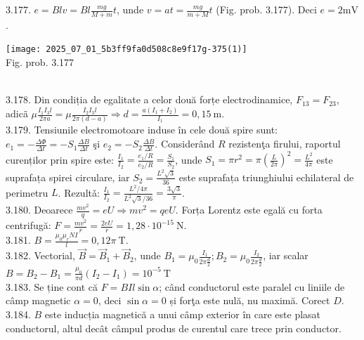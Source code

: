 \begin{center}
3.177. $e=B l v=B l \frac{m g}{M+m} t$, unde $v=a t=\frac{m g}{m+M} t$ (Fig. prob. 3.177). Deci $e=2 \mathrm{mV}$.\\ \begin{center} \texttt{[image: 2025\_07\_01\_5b3ff9fa0d508c8e9f17g-375(1)]}\\ Fig. prob. 3.177 \end{center}\\

3.178. Din condiția de egalitate a celor două forțe electrodinamice, $F_{13}=F_{23}$, adicã $\mu \frac{I_{1} I_{3} l}{2 \pi a}=\mu \frac{I_{2} I_{3} l}{2 \pi(d-a)} \Rightarrow d=\frac{a\left(I_{1}+I_{2}\right)}{I_{1}}=0,15 \mathrm{~m}$.\\

3.179. Tensiunile electromotoare induse în cele două spire sunt: $e_{1}=-\frac{\Delta \Phi}{\Delta t}=-S_{1} \frac{\Delta B}{\Delta t}$ şi $e_{2}=-S_{2} \frac{\Delta B}{\Delta t}$. Considerând $R$ rezistenţa firului, raportul curenților prin spire este: $\frac{I_{1}}{I_{2}}=\frac{e_{1} / R}{e_{2} / R}=\frac{S_{1}}{S_{2}}$, unde $S_{1}=\pi r^{2}=\pi\left(\frac{L}{2 \pi}\right)^{2}=\frac{L^{2}}{4 \pi}$ este suprafața spirei circulare, iar $S_{2}=\frac{L^{2} \sqrt{3}}{36}$ este suprafața triunghiului echilateral de perimetru $L$. Rezultǎ: $\frac{I_{1}}{I_{2}}=\frac{L^{2} / 4 \pi}{L^{2} \sqrt{3} / 36}=\frac{3 \sqrt{3}}{\pi}$.\\

3.180. Deoarece $\frac{m v^{2}}{q}=e U \Rightarrow m v^{2}=q e U$. Forța Lorentz este egală cu forta centrifugă: $F=\frac{m v^{2}}{r}=\frac{2 e U}{r}=1,28 \cdot 10^{-15} \mathrm{~N}$.\\

3.181. $B=\frac{\mu_{0} \mu_{r} N I}{l}=0,12 \pi \mathrm{~T}$.\\

3.182. Vectorial, $\vec{B}=\vec{B}_{1}+\vec{B}_{2}$, unde $B_{1}=\mu_{0} \frac{I_{1}}{2 \pi \frac{d}{2}} ; B_{2}=\mu_{0} \frac{I_{2}}{2 \pi \frac{d}{2}}$, iar scalar\\$B=B_{2}-B_{1}=\frac{\mu_{0}}{\pi d}\left(I_{2}-I_{1}\right)=10^{-5} \mathrm{~T}$\\

3.183. Se ține cont că $F=B I l \sin \alpha$; când conductorul este paralel cu liniile de câmp magnetic $\alpha=0$, deci $\sin \alpha=0$ și forţa este nulă, nu maximă. Corect $D$.\\

3.184. $B$ este inducția magnetică a unui câmp exterior în care este plasat conductorul, altul decât câmpul produs de curentul care trece prin conductor.\\


\end{center}
